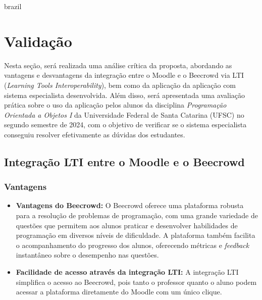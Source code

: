 

\begin{otherlanguage*}{brazil}

\chapter{Validação}

Nesta seção, será realizada uma análise crítica da proposta, abordando as vantagens e desvantagens da integração entre o Moodle e o Beecrowd via LTI (\textit{Learning Tools Interoperability}), bem como da aplicação da aplicação com sistema especialista desenvolvida. Além disso, será apresentada uma avaliação prática sobre o uso da aplicação pelos alunos da disciplina \textit{Programação Orientada a Objetos I} da Universidade Federal de Santa Catarina (UFSC) no segundo semestre de 2024, com o objetivo de verificar se o sistema especialista conseguiu resolver efetivamente as dúvidas dos estudantes.

\section{Integração LTI entre o Moodle e o Beecrowd}

\subsection{Vantagens}
\begin{itemize}
    \item \textbf{Vantagens do Beecrowd:} O Beecrowd oferece uma plataforma robusta para a resolução de problemas de programação, com uma grande variedade de questões que permitem aos alunos praticar e desenvolver habilidades de programação em diversos níveis de dificuldade. A plataforma também facilita o acompanhamento do progresso dos alunos, oferecendo métricas e \textit{feedback} instantâneo sobre o desempenho nas questões.
    \item \textbf{Facilidade de acesso através da integração LTI:} A integração LTI simplifica o acesso ao Beecrowd, pois tanto o professor quanto o aluno podem acessar a plataforma diretamente do Moodle com um único clique.
\end{itemize}


\end{otherlanguage*}
